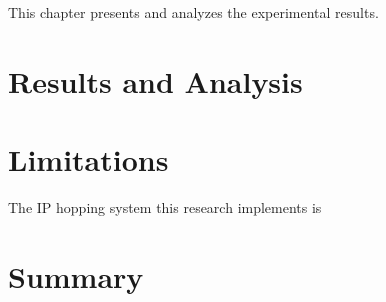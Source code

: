 \begin{comment}
\lettrine{D}{escribe} the results you obtained when applying the design described in Chapter 3.
At the same time, provide a running analysis of the results. This analysis is probably
the most important part of the whole written thesis, because this is where your real
insights into the problem/solution are documented. Avoid simply showing
plots/tables of results with no analysis.
\end{comment}

\par This chapter presents and analyzes the experimental results. 

\section{Results and Analysis}


\section{Limitations}
\par The \ac{IP} hopping system this research implements is  

\section{Summary}

